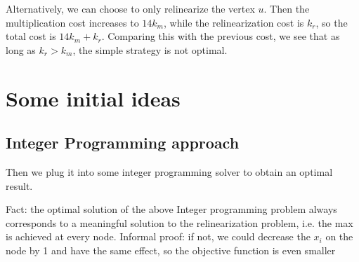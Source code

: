 \documentclass[11pt]{article} %
\theoremstyle{plain}
\theoremstyle{definition}
\begin{document}
\iffalse
\begin{center}
\begin{tikzpicture}[commutative diagrams/every diagram] 
\node (P0) at (2,5) {\red{6} \blue{26}}; 
\node (P1) at (1,3) {\red{4} \blue{18}} ; 
\node (P2) at (3,3) {\red{3} \blue{0}};
\node (P3) at (0,1) {\red{2} \blue{0}};
\node (P4) at (2,1) {\red{3} \blue{14}};
\node (P5) at (4,1) {\red{2} \blue{0}};
\node (P6) at (-0.5,-1) {\red{2} \blue{0}};
\node (P7) at (0.5,-1) {\red{2} \blue{0}};
\node (P8) at (1.5,-1) {\red{2} \blue{0}};
\node (P9) at (2.5,-1) {\red{2} \blue{0}};
\node (P10) at (3.5,-1) {\red{2} \blue{0}};
\node (P11) at (4.5,-1) {\red{2} \blue{0}};
\path[commutative diagrams/.cd, every arrow, every label] 

(P1) edge node[swap] {} (P0)  
(P2) edge node[swap] {} (P0) 
(P3) edge node {} (P1) 
(P4) edge node {} (P1) 
(P4) edge node {} (P2) 
(P5) edge node {} (P2)
(P6) edge node {} (P3)
(P7) edge node[swap] {} (P3)
(P8) edge node {} (P4)
(P9) edge node[swap] {} (P4)
(P10) edge node  {}  (P5)
(P11) edge node[swap] {} (P5);
\end{tikzpicture}
\end{center}
The total cost is 14 + 18 + 26 = 58.  (FIXME) 
\fi
Alternatively, we can choose to only relinearize the vertex $u$. Then the multiplication cost increases to $14k_m$, while the relinearization cost is $k_r$, so the total cost is $14k_m + k_r$. Comparing this with the previous cost, we see that as long as  $k_r > k_m$, the simple strategy is not optimal. 



\iffalse
\section{Some initial ideas}

\subsection{Integer Programming approach}






Then we plug it into some integer programming solver to obtain an optimal result. 

Fact: the optimal solution of the above Integer programming problem always corresponds to a meaningful solution to the relinearization problem, i.e. the max is achieved at every node. Informal proof: if not, we could decrease the $x_i$ on the node by 1 and have the same effect, so the objective function is even smaller
\end{document}
